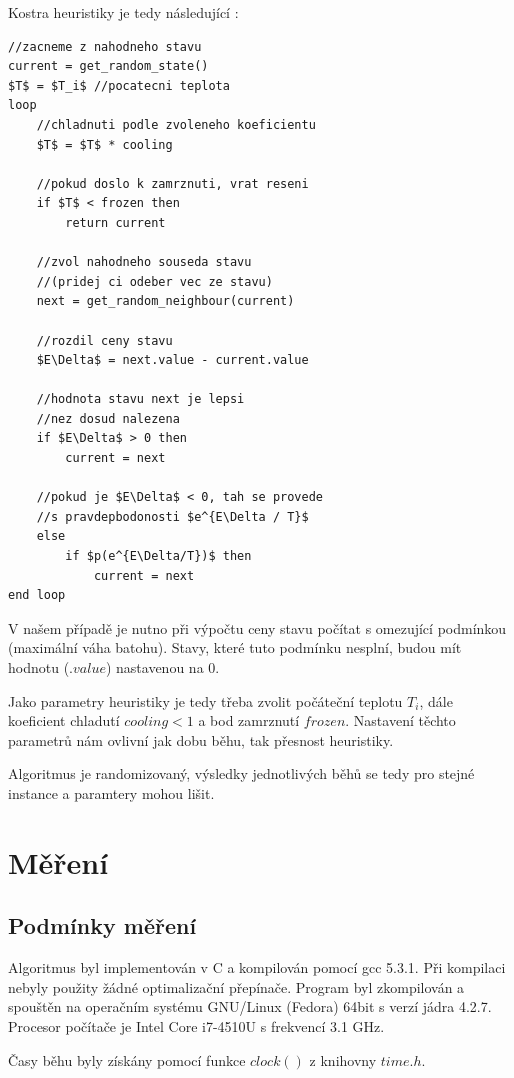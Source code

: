 \documentclass[11pt]{article}
\begin{document}
Kostra heuristiky je tedy následující \cite{aibook}:

\begin{lstlisting}[mathescape]
//zacneme z nahodneho stavu
current = get_random_state()
$T$ = $T_i$ //pocatecni teplota
loop
	//chladnuti podle zvoleneho koeficientu
	$T$ = $T$ * cooling

	//pokud doslo k zamrznuti, vrat reseni
	if $T$ < frozen then
		return current

	//zvol nahodneho souseda stavu
	//(pridej ci odeber vec ze stavu)
	next = get_random_neighbour(current)
	
	//rozdil ceny stavu
	$E\Delta$ = next.value - current.value

	//hodnota stavu next je lepsi 
	//nez dosud nalezena
	if $E\Delta$ > 0 then
		current = next
	
	//pokud je $E\Delta$ < 0, tah se provede
	//s pravdepbodonosti $e^{E\Delta / T}$
	else
		if $p(e^{E\Delta/T})$ then
			current = next
end loop
\end{lstlisting}

V našem případě je nutno při výpočtu ceny stavu počítat s omezující podmínkou (maximální váha batohu). Stavy, které tuto podmínku nesplní, budou mít hodnotu ($.value$) nastavenou na 0.

Jako parametry heuristiky je tedy třeba zvolit počáteční teplotu $T_i$, dále koeficient chladutí $cooling < 1$ a bod zamrznutí $frozen$. Nastavení těchto parametrů nám ovlivní jak dobu běhu, tak přesnost heuristiky.

Algoritmus je randomizovaný, výsledky jednotlivých běhů se tedy pro stejné instance a paramtery mohou lišit.

\section{Měření}

\subsection{Podmínky měření}

Algoritmus byl implementován v C a kompilován pomocí gcc 5.3.1. Při kompilaci nebyly použity žádné optimalizační přepínače. Program byl zkompilován a spouštěn na operačním systému GNU/Linux (Fedora) 64bit s verzí jádra 4.2.7. Procesor počítače je Intel Core i7-4510U s frekvencí 3.1 GHz.

Časy běhu byly získány pomocí funkce $clock()$ z knihovny $time.h$.
\end{document}

